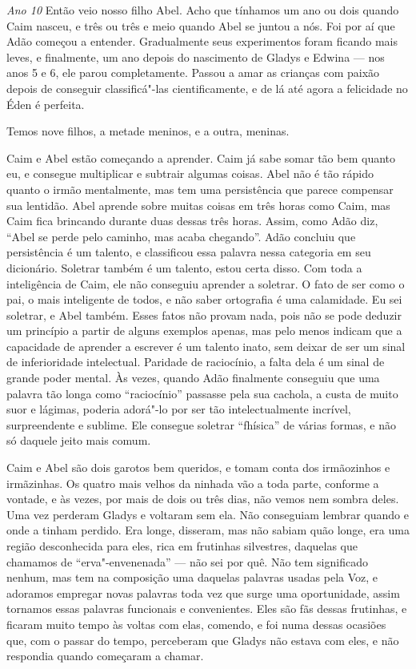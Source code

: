 \textit{Ano 10} Então veio nosso filho Abel. Acho que tínhamos um ano ou dois quando Caim
nasceu, e três ou três e meio quando Abel se juntou a nós. Foi por aí que Adão
começou a entender. Gradualmente seus experimentos foram ficando mais leves, e
finalmente, um ano depois do nascimento de Gladys e Edwina --- nos anos 5 e 6, ele
parou completamente. Passou a amar as crianças com paixão depois de conseguir
classificá"-las cientificamente, e de lá até agora a felicidade no Éden é
perfeita.

Temos nove filhos, a metade meninos, e a outra, meninas.

Caim e Abel estão começando a aprender. Caim já sabe somar tão bem quanto eu, e
consegue multiplicar e subtrair algumas coisas. Abel não é tão rápido quanto o
irmão mentalmente, mas tem uma persistência que parece compensar sua lentidão. Abel aprende
sobre muitas coisas em três horas como Caim, mas Caim fica brincando durante duas
dessas três horas. Assim, como Adão diz, “Abel se perde pelo caminho,
mas acaba chegando”. Adão concluiu que persistência é um talento, e
classificou essa palavra nessa categoria em seu dicionário. Soletrar também é
um talento, estou certa disso. Com toda a inteligência de Caim, ele não conseguiu
aprender a soletrar. O fato de ser como o pai, o mais inteligente
de todos, e não saber ortografia é uma calamidade. Eu sei soletrar, e Abel
também. Esses fatos não provam nada, pois não se pode deduzir um
princípio a partir de alguns exemplos apenas, mas pelo menos indicam que a capacidade
de aprender a escrever é um talento inato, sem deixar de
ser um sinal de inferioridade intelectual. Paridade de raciocínio, a falta dela é    
um sinal de grande poder mental. Às vezes, quando Adão finalmente conseguiu que uma
palavra tão longa como “raciocínio” passasse pela sua cachola, a custa de muito suor e lágimas, 
poderia adorá"-lo por ser tão intelectualmente incrível, surpreendente e
sublime. Ele consegue soletrar “fhísica” de várias formas, e não só daquele jeito mais comum.

Caim e Abel são dois garotos bem queridos, e tomam conta dos irmãozinhos e
irmãzinhas. Os quatro mais velhos da ninhada vão a toda parte, conforme a vontade, e
às vezes, por mais de dois ou três dias, não vemos nem sombra deles. Uma vez
perderam Gladys e voltaram sem ela. Não conseguiam lembrar
quando e onde a tinham perdido. Era longe, disseram, mas não sabiam quão longe,
era uma região desconhecida para eles, rica em frutinhas
silvestres, daquelas que chamamos de “erva"-envenenada” --- não sei por quê. Não tem
significado nenhum, mas tem na composição uma daquelas palavras usadas pela Voz, e
adoramos empregar novas palavras toda vez que surge uma oportunidade, assim
tornamos essas palavras funcionais e convenientes. Eles são fãs dessas frutinhas,
e ficaram muito tempo às voltas com elas, comendo, e foi numa dessas ocasiões que, com o passar do
tempo, perceberam que Gladys não estava com eles, e não respondia quando
começaram a chamar.

